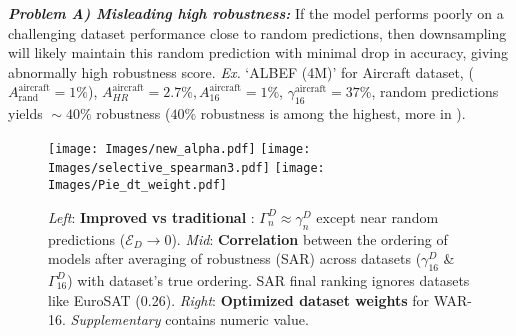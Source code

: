 \textbf{\textit{Problem A) Misleading high robustness:}} If the model performs poorly on a challenging dataset \ie performance close to random predictions, then downsampling will likely maintain this random prediction with minimal drop in accuracy, giving abnormally high robustness score. \textit{Ex.} `ALBEF (4M)' for Aircraft dataset, ($A_{\text{rand}}^{\text{aircraft}}\!=\!1\%$), $A_{HR}^{\text{aircraft}}\!=\!2.7\%, A_{16}^{\text{aircraft}}\!=\!1\%$,
\underline{$\gamma_{16}^{\text{aircraft}}\!=\!37\%$}, \ie random predictions yields $\!\sim\!40\%$ robustness ($40\%$ robustness is among the highest, more in \Supp).  


\begin{figure}[!t]
\centering 
\subfloat
{
\texttt{[image: Images/new\_alpha.pdf]}
}
\hfill
\subfloat
{
\texttt{[image: Images/selective\_spearman3.pdf]}
}
\hfill
\subfloat
{
\texttt{[image: Images/Pie\_dt\_weight.pdf]}
}
\vspace*{-3pt}
\caption{ 
\textit{Left}: {\textbf{Improved} 
 } \textbf{vs traditional} {}:
$\!\Gamma^{D}_{n}\!\approx\!\gamma^{D}_{n}\!$ except near random predictions ($\mathcal{E}_D\!\rightarrow\!0$). 
\textit{Mid}: \textbf{Correlation} 
between the ordering of models after averaging of robustness (SAR) across datasets ($\gamma^{D}_{16}$ \& $\Gamma^{D}_{16}$) with dataset's true ordering. 
SAR final ranking ignores datasets like EuroSAT (0.26). 
\textit{Right}: \textbf{Optimized dataset weights} for WAR-16. \textit{Supplementary} contains numeric value. 
}
\label{fig:datasets_weights}
\label{fig:corr_both_gamma}
\label{fig:new_gamma_old_gamma}
\label{fig:hyperparam_war}
\vspace{-3pt}
\end{figure}

